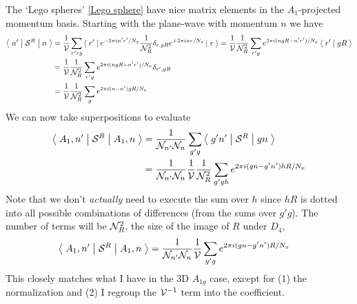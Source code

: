 The `Lego spheres' \eqref{Lego sphere} have nice matrix elements in the $A_1$-projected momentum basis.
Starting with the plane-wave with momentum $n$ we have
\begin{align}
    \left\langle\;n'\;\middle|\;\mathcal{S}^{R}\;\middle|\;n\;\right\rangle
    &=
    \frac{1}{\mathcal{V}} \sum_{r'rg} \left\langle\;r'\;\right| e^{-2\pi i n'r' / N_x} \frac{1}{\mathcal{N}_{R}^2} \delta_{r,gR} e^{+2\pi i nr / N_x} \left|\;r\;\right\rangle
    =
    \frac{1}{\mathcal{V}} \frac{1}{\mathcal{N}_{R}^2} \sum_{r'g} e^{2\pi i (n gR - n'r') / N_x} \left\langle\;r'\;\middle|\;gR\;\right\rangle
    \\
    &=
    \frac{1}{\mathcal{V}} \frac{1}{\mathcal{N}_{R}^2} \sum_{r'g} e^{2\pi i (n gR - n'r') / N_x} \delta_{r',gR}
    \\
    &=
    \frac{1}{\mathcal{V}} \frac{1}{\mathcal{N}_{R}^2} \sum_{g} e^{2\pi i (n-n') gR / N_x}
\end{align}
We can now take superpositions to evaluate
\begin{align}
    \left\langle\;A_1, n'\;\middle|\;\mathcal{S}^{R}\;\middle|\;A_1, n\;\right\rangle
    &=
    \frac{1}{\mathcal{N}_{n'}\mathcal{N}_{n}} \sum_{g'g} \left\langle\;g'n'\;\middle|\;\mathcal{S}^{R}\;\middle|\;gn\;\right\rangle
    \\
    &=
    \frac{1}{\mathcal{N}_{n'}\mathcal{N}_{n}} \frac{1}{\mathcal{V}}\frac{1}{\mathcal{N}_{R}^2} \sum_{g'gh} e^{2\pi i (gn-g'n') hR / N_x}
\end{align}
Note that we don't \emph{actually} need to execute the sum over $h$ since $hR$ is dotted into all possible combinations of differences (from the sums over $g'g$).
The number of terms will be $\mathcal{N}_{R}^2$, the size of the image of $R$ under $D_4$, 
\begin{align}
    \left\langle\;A_1, n'\;\middle|\;\mathcal{S}^{R}\;\middle|\;A_1, n\;\right\rangle
    &=
    \frac{1}{\mathcal{N}_{n'}\mathcal{N}_{n}} \frac{1}{\mathcal{V}} \sum_{g'g} e^{2\pi i (gn-g'n') R / N_x}
\end{align}
This closely matches what I have in the 3D $A_{1g}$ case, except for (1) the normalization and (2) I regroup the $\mathcal{V}^{-1}$ term into the coefficient.


